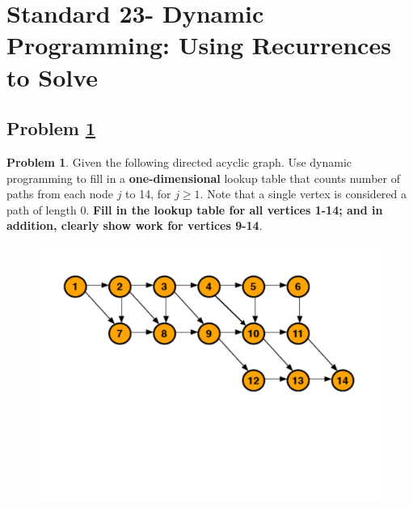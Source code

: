 \documentclass[11pt]{article}
\theoremstyle{definition}
\theoremstyle{definition}
\newtheorem{required}{Problem}
\theoremstyle{definition}
\begin{document}
\newpage
\section{Standard 23- Dynamic Programming: Using Recurrences to Solve}

\subsection{Problem \ref{Recurrence1}}
\begin{required} \label{Recurrence1}
Given the following directed acyclic graph. Use dynamic programming to fill in a \textbf{one-dimensional} lookup table that counts number of paths from each node $j$ to 14, for $j \geq 1$. Note that a single vertex is considered a path of length $0$. \textbf{Fill in the lookup table for all vertices 1-14; and in addition, clearly show work for vertices 9-14}.

        \begin{figure}[h!]
        \begin{center}
        \includegraphics[scale=0.45]{dag_ps10.pdf} 
        \end{center}
        \end{figure}

\end{required}
\end{document}

